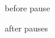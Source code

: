 \documentclass{beamer}
\begin{document}
\begin{frame}
    before pause

    \pause[5]

    after pauses
\end{frame}
\end{document}
